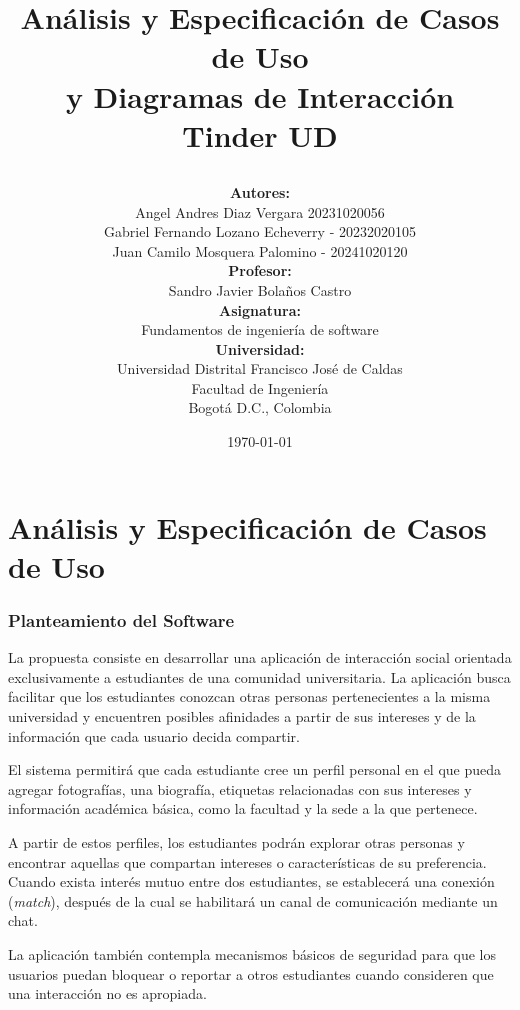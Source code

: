 \documentclass[11pt,a4paper]{article}
\title{

    \LogoUni
    \textbf{Análisis y Especificación de Casos de Uso\\
    y Diagramas de Interacción}\\
    \vspace{0.5cm}
    \large Tinder UD
    \vspace{0.3cm}
}
\author{
    \vspace{0.7cm}
    \textbf{Autores:}\\
    Angel Andres Diaz Vergara 20231020056\\ Gabriel Fernando Lozano Echeverry - 20232020105\\
    Juan Camilo Mosquera Palomino - 20241020120\\[1.5em]
    \vspace{0.7cm}
    \textbf{Profesor:}\\
    Sandro Javier Bolaños Castro\\[1.5em]
    \vspace{0.7cm}
    \textbf{Asignatura:}\\
    Fundamentos de ingeniería de software\\[1.5em]
    \vspace{0.7cm}
    \textbf{Universidad:}\\
    Universidad Distrital Francisco José de Caldas\\
    Facultad de Ingeniería\\
    Bogotá D.C., Colombia\\[1em]
}
\date{\today}
\begin{document}
\maketitle

\tableofcontents

\newpage


\part{Análisis y Especificación de Casos de Uso}


\section{Planteamiento del Software}

La propuesta consiste en desarrollar una aplicación de interacción social orientada
exclusivamente a estudiantes de una comunidad universitaria. La aplicación busca
facilitar que los estudiantes conozcan otras personas pertenecientes a la misma
universidad y encuentren posibles afinidades a partir de sus intereses y de la
información que cada usuario decida compartir.

El sistema permitirá que cada estudiante cree un perfil personal en el que pueda
agregar fotografías, una biografía, etiquetas relacionadas con sus intereses y
información académica básica, como la facultad y la sede a la que pertenece.

A partir de estos perfiles, los estudiantes podrán explorar otras personas y
encontrar aquellas que compartan intereses o características de su preferencia.
Cuando exista interés mutuo entre dos estudiantes, se establecerá una conexión
(\textit{match}), después de la cual se habilitará un canal de comunicación mediante
un chat.

La aplicación también contempla mecanismos básicos de seguridad para que los
usuarios puedan bloquear o reportar a otros estudiantes cuando consideren que una
interacción no es apropiada.

\end{document}
